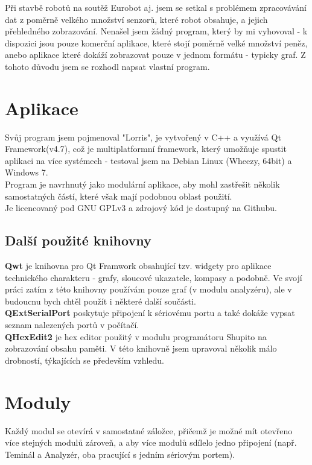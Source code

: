 \documentclass[12pt, a4paper, oneside]{article}
\begin{document}
Při stavbě robotů na soutěž Eurobot aj. jsem se setkal s problémem zpracovávání dat z poměrně velkého množství senzorů, které robot obsahuje, a jejich přehledného zobrazování. Nenašel jsem žádný program, který by mi vyhovoval - k dispozici jsou pouze komerční aplikace, které stojí poměrně velké množství peněz, anebo aplikace které dokáží zobrazovat pouze v jednom formátu - typicky graf. Z tohoto důvodu jsem se rozhodl napsat vlastní program.

\section*{Aplikace}
Svůj program jsem pojmenoval "Lorris", je vytvořený v C++ a využívá Qt Framework(v4.7)\cite{qtfw}, což je multiplatformní framework, který umožňuje spustit aplikaci na více systémech - testoval jsem na Debian Linux (Wheezy, 64bit) a Windows 7. \\
Program je navrhnutý jako modulární aplikace, aby mohl zastřešit několik samostatných částí, které však mají podobnou oblast použití. \\
Je licencovaný pod GNU GPLv3 a zdrojový kód je dostupný na Githubu\cite{repo}.


\subsection*{Další použité knihovny}
{\bf Qwt} je knihovna pro Qt Framwork obsahující tzv. widgety pro aplikace technického charakteru - grafy, sloucové ukazatele, kompasy a podobně. Ve svojí práci
zatím z této knihovny používám pouze graf (v modulu analyzéru), ale v budoucnu bych chtěl použít i některé další součásti. \\
{\bf QExtSerialPort} poskytuje připojení k sériovému portu a také dokáže vypsat seznam nalezených portů v počítačí.\\
{\bf QHexEdit2} je hex editor použitý v modulu programátoru Shupito na zobrazování obsahu paměti. V této knihovně jsem upravoval několik málo drobností, 
týkajících se především vzhledu.

\newpage
\setlength{\voffset}{0mm} %
\pagestyle{plain}

\section*{Moduly}
Každý modul se otevírá v samostatné záložce, přičemž je možné mít otevřeno více stejných modulů zároveň, a aby více modulů sdílelo jedno připojení (např. Teminál a Analyzér, oba pracující s jedním sériovým portem).
\end{document}
